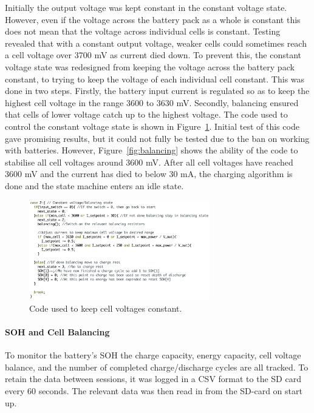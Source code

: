 \documentclass[a4paper]{article}
\begin{document}
Initially the output voltage was kept constant in the constant voltage 
state. However, even if the voltage across the battery pack as a whole is 
constant this does not mean that the voltage across individual cells is constant. 
Testing revealed that with a constant output voltage, weaker cells could sometimes 
reach a cell voltage over 3700 mV as current died down. To prevent this, the 
constant voltage state was redesigned from keeping the voltage across the battery 
pack constant, to trying to keep the voltage of each individual cell constant. 
This was done in two steps. Firstly, the battery input current is regulated so 
as to keep the highest cell voltage in the range 3600 to 3630 mV. Secondly, 
balancing ensured that cells of lower voltage catch up to the highest voltage. 
The code used to control the constant voltage state is shown in 
Figure~\ref{fig:Constant_Voltage}. Initial test of this code gave promising 
results, but it could not fully be tested due to the ban on working with 
batteries. However, Figure~\ref{fig:balancing} shows the ability of the code 
to stabilise all cell voltages around 3600 mV. After all cell voltages have 
reached 3600 mV and the current has died to below 30 mA, the charging algorithm 
is done and the state machine enters an idle state. 

\begin{figure}[H]
    \centering
    \includegraphics[width = 0.7\textwidth]{Constant_voltage.png}
    \caption{Code used to keep cell voltages constant.}
    \vspace{-10pt}
    \label{fig:Constant_Voltage}
\end{figure}

\paragraph*{SOH and Cell Balancing}
\vspace{-6pt}
To monitor the battery’s SOH the charge capacity, energy capacity, 
cell voltage balance, and the number of completed charge/discharge 
cycles are all tracked. To retain the data between sessions, it was 
logged in a CSV format to the SD card every 60 seconds. The relevant data 
was then read in from the SD-card on start up.
\end{document}
